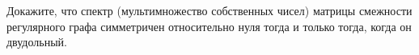 Докажите, что спектр (мультимножество собственных чисел) матрицы смежности регулярного графа симметричен относительно нуля
тогда и только тогда, когда он двудольный.